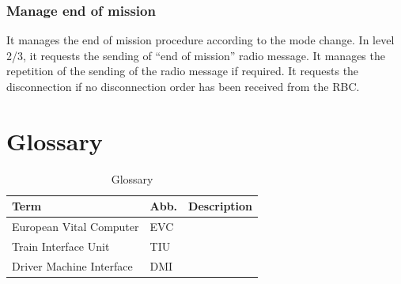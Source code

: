 \documentclass[nocc]{template/openetcs_report}
\begin{document}
\subsection{Manage end of mission}
It manages the end of mission procedure according to the mode change. In level 2/3, it requests the sending of “end of mission” radio message. 
It manages the repetition of the sending of the radio message if required. 
It requests the disconnection if no disconnection order has been received from the RBC.

\appendix
\chapter{Glossary}
			\begin{longtable}{|l|l|l|}
				\caption{Glossary}\\ 
				\hline
				
					\begin{minipage}[t]{0.40\linewidth} \textbf{Term}	\end{minipage} 
				&	\begin{minipage}[t]{0.20\linewidth} \textbf{Abb.}	\end{minipage} 
				&	\begin{minipage}[t]{0.40\linewidth} \textbf{Description} \end{minipage} \\
				
				\hline
					\begin{minipage}[t]{0.40\linewidth} European Vital Computer	\end{minipage} 
				&	\begin{minipage}[t]{0.20\linewidth} EVC	\end{minipage} 
				&	\begin{minipage}[t]{0.40\linewidth} \end{minipage} \\
				
				\hline
					\begin{minipage}[t]{0.40\linewidth} Train Interface Unit	\end{minipage} 
				&	\begin{minipage}[t]{0.20\linewidth} TIU	\end{minipage} 
				&	\begin{minipage}[t]{0.40\linewidth} \end{minipage} \\
				
				\hline
					\begin{minipage}[t]{0.40\linewidth} Driver Machine Interface	\end{minipage} 
				&	\begin{minipage}[t]{0.20\linewidth} DMI	\end{minipage} 
				&	\begin{minipage}[t]{0.40\linewidth} \end{minipage} \\
				

\end{longtable}
\end{document}
